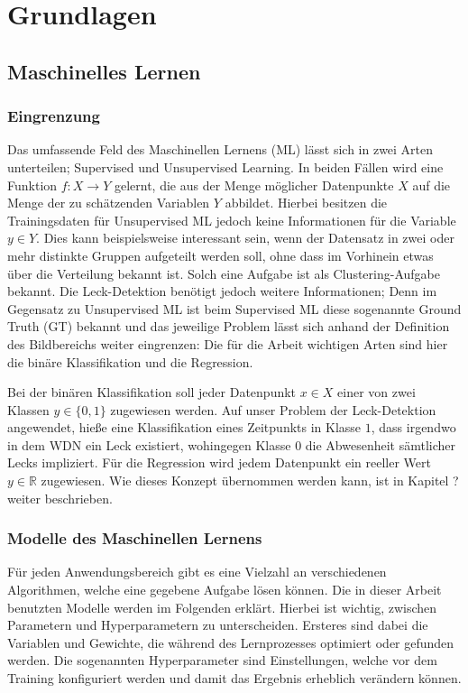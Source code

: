 \chapter{Grundlagen}

\section{Maschinelles Lernen}

\subsection*{Eingrenzung}

Das umfassende Feld des Maschinellen Lernens (ML) lässt sich in zwei Arten unterteilen;
 Supervised und Unsupervised Learning. In beiden Fällen wird eine Funktion $f: X \rightarrow Y$ gelernt,
 die aus der Menge möglicher Datenpunkte $X$ auf die Menge der zu schätzenden Variablen $Y$ abbildet.
 Hierbei besitzen die Trainingsdaten für Unsupervised ML jedoch keine Informationen für die
 Variable $y \in Y$. Dies kann beispielsweise interessant sein, wenn der Datensatz in zwei oder mehr distinkte
 Gruppen aufgeteilt werden soll, ohne dass im Vorhinein etwas über die Verteilung bekannt ist. Solch eine
 Aufgabe ist als Clustering-Aufgabe bekannt. Die Leck-Detektion benötigt jedoch weitere Informationen;
 Denn im Gegensatz zu Unsupervised ML ist beim Supervised ML diese sogenannte Ground Truth (GT) bekannt und
 das jeweilige Problem lässt sich anhand der Definition des Bildbereichs weiter eingrenzen: Die für die
 Arbeit wichtigen Arten sind hier die binäre Klassifikation und die Regression.

Bei der binären Klassifikation soll jeder Datenpunkt $x \in X$ einer von zwei Klassen $y \in \{0, 1\}$ zugewiesen
 werden. Auf unser Problem der Leck-Detektion angewendet, hieße eine Klassifikation eines Zeitpunkts in
 Klasse $1$, dass irgendwo in dem WDN ein Leck existiert, wohingegen Klasse $0$ die Abwesenheit sämtlicher
 Lecks impliziert. Für die Regression wird jedem Datenpunkt ein reeller Wert $y \in \mathbb{R}$ zugewiesen.
Wie dieses Konzept übernommen werden kann, ist in Kapitel ? weiter beschrieben. 


\subsection*{Modelle des Maschinellen Lernens}

Für jeden Anwendungsbereich gibt es eine Vielzahl an verschiedenen Algorithmen, welche eine gegebene Aufgabe
 lösen können. Die in dieser Arbeit benutzten Modelle werden im Folgenden erklärt. Hierbei ist wichtig, zwischen
 Parametern und Hyperparametern zu unterscheiden. Ersteres sind dabei die Variablen und Gewichte, die während
 des Lernprozesses optimiert oder gefunden werden. Die sogenannten Hyperparameter sind Einstellungen, welche
 vor dem Training konfiguriert werden und damit das Ergebnis erheblich verändern können.

